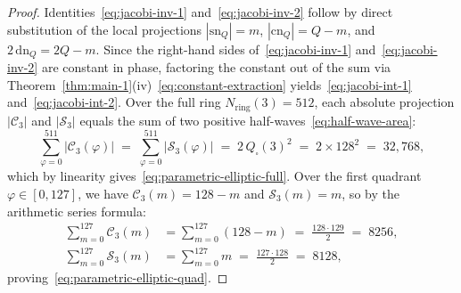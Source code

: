 \documentclass[11pt,a4paper]{article}
\theoremstyle{plain}
\theoremstyle{definition}
\begin{document}
\begin{proof}
Identities~\eqref{eq:jacobi-inv-1} and~\eqref{eq:jacobi-inv-2} follow by direct substitution of the local projections $|\mathrm{sn}_Q| = m$, $|\mathrm{cn}_Q| = Q - m$, and $2\,\mathrm{dn}_Q = 2Q - m$. Since the right-hand sides of~\eqref{eq:jacobi-inv-1} and~\eqref{eq:jacobi-inv-2} are constant in phase, factoring the constant out of the sum via Theorem~\ref{thm:main-1}(iv)~\eqref{eq:constant-extraction} yields~\eqref{eq:jacobi-int-1} and~\eqref{eq:jacobi-int-2}. Over the full ring $N_{\mathrm{ring}}(3) = 512$, each absolute projection $|\mathcal{C}_3|$ and $|\mathcal{S}_3|$ equals the sum of two positive half-waves~\eqref{eq:half-wave-area}:
\begin{equation*}
  \sum_{\varphi=0}^{511} |\mathcal{C}_3(\varphi)| \;=\; \sum_{\varphi=0}^{511} |\mathcal{S}_3(\varphi)| \;=\; 2\,Q_\square(3)^2 \;=\; 2\times 128^2 \;=\; 32,768,
\end{equation*}
which by linearity gives~\eqref{eq:parametric-elliptic-full}. Over the first quadrant $\varphi \in [0, 127]$, we have $\mathcal{C}_3(m) = 128 - m$ and $\mathcal{S}_3(m) = m$, so by the arithmetic series formula:
\begin{align*}
  \sum_{m=0}^{127} \mathcal{C}_3(m) &= \sum_{m=0}^{127} (128 - m) \;=\; \frac{128\cdot 129}{2} \;=\; 8256, \\
  \sum_{m=0}^{127} \mathcal{S}_3(m) &= \sum_{m=0}^{127} m \;=\; \frac{127\cdot 128}{2} \;=\; 8128,
\end{align*}
proving~\eqref{eq:parametric-elliptic-quad}.
\end{proof}
\end{document}
